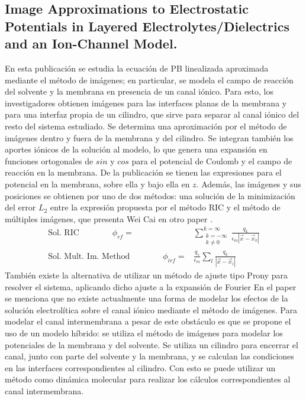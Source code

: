 \documentclass[12pt, notitlepage]{article}
\begin{document}
\subsection{Image Approximations to Electrostatic Potentials in Layered Electrolytes/Dielectrics and an Ion-Channel Model.\cite{Huimin-Lin}}
En esta publicación se estudia la ecuación de PB linealizada aproximada mediante el método de imágenes; en particular, se modela el campo de reacción del solvente y la membrana en presencia de un canal iónico. Para esto, los investigadores obtienen imágenes para las interfaces planas de la membrana y para una interfaz propia de un cilindro, que sirve para separar al canal iónico del resto del sistema estudiado. Se determina una aproximación por el método de imágenes dentro y fuera de la membrana y del cilindro. Se integran también los aportes iónicos de la solución al modelo, lo que genera una expansión en funciones ortogonales de $sin$ y $cos$ para el potencial de Coulomb y el campo de reacción en la membrana. De la publicación se tienen las expresiones para el potencial en la membrana, sobre ella y bajo ella en $z$. Además, las imágenes y sus posiciones se obtienen por uno de dos métodos: una solución de la minimización del error $L_2$ entre la expresión propuesta por el método RIC \cite{Pei-kun} y el método de múltiples imágenes, que presenta Wei Cai en otro paper \cite{Wei-Cai}.
\begin{align*}
\text{Sol. RIC}\qquad\qquad \phi_{rf} = &\sum_{\substack{k = -\infty\\
k \neq 0}}^{k = \infty} \frac{q_k}{\epsilon_m|\vec{x} - \vec{x}_k|}\\
\text{Sol. Mult. Im. Method}\qquad\qquad \phi_{irf} = & \frac{q_s}{\epsilon_m}\sum_{l}\frac{q_k}{|\vec{x} - \vec{x}_l|}
\end{align*}
También existe la alternativa de utilizar un método de ajuste tipo Prony para resolver el sistema, aplicando dicho ajuste a la expansión de Fourier
En el paper se menciona que no existe actualmente una forma de modelar los efectos de la solución electrolítica sobre el canal iónico mediante el método de imágenes. Para modelar el canal intermembrana a pesar de este obstáculo es que se propone el uso de un modelo híbrido: se utiliza el método de imágenes para modelar los potenciales de la membrana y del solvente. Se utiliza un cilindro para encerrar el canal, junto con parte del solvente y la membrana, y se calculan las condiciones en las interfaces correspondientes al cilindro. Con esto se puede utilizar un método como dinámica molecular para realizar los cálculos correspondientes al canal intermembrana.
\end{document}
